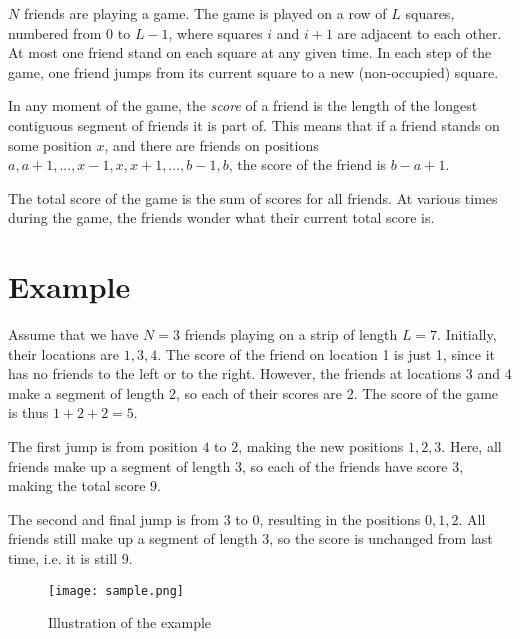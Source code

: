 \newcommand\version{v1}
$N$ friends are playing a game. The game is played on a row of $L$ squares, numbered from $0$ to $L - 1$, where squares $i$ and $i+1$ are adjacent to each other. At most one friend stand on each square
at any given time. In each step of the game, one friend jumps from its current square to a new (non-occupied) square.

In any moment of the game, the \emph{score} of a friend is the length of the longest contiguous segment
of friends it is part of. This means that if a friend stands on some position $x$, and there are friends
on positions $a, a + 1, ..., x - 1, x, x + 1, ..., b - 1, b$, the score of the friend is $b - a + 1$.

The total score of the game is the sum of scores for all friends. At various times during the game, the friends wonder what their current total score is.

\section*{Example}
Assume that we have $N = 3$ friends playing on a strip of length $L = 7$. Initially,
their locations are $1, 3, 4$. The score of the friend on location 1 is just 1, since it has no friends
to the left or to the right. However, the friends at locations 3 and 4 make a segment of length 2, so
each of their scores are 2. The score of the game is thus $1 + 2 + 2 = 5$.

The first jump is from position $4$ to $2$, making the new positions $1, 2, 3$. Here, all friends
make up a segment of length 3, so each of the friends have score 3, making the total score 9.

The second and final jump is from $3$ to $0$, resulting in the positions $0, 1, 2$. All friends
still make up a segment of length 3, so the score is unchanged from last time, i.e. it is still 9.

\begin{figure}[h!]
  \centering
  \texttt{[image: sample.png]}
  \caption{Illustration of the example}
\end{figure}

